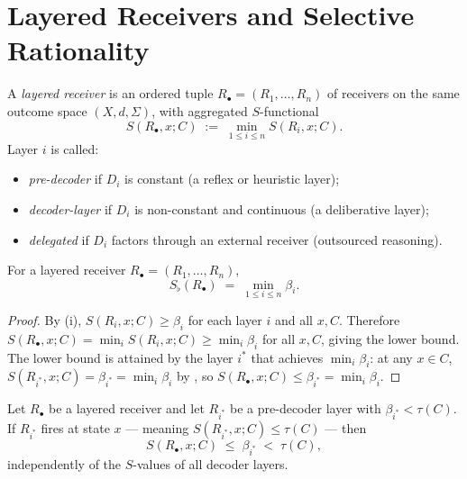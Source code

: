 \documentclass[twocolumn,11pt,a4paper]{article}
\newcommand{\Sfloor}{S_{\flat}}
\begin{document}
\section{Layered Receivers and Selective Rationality}
\label{sec:layered}

\begin{definition}
\label{def:layered}
A \emph{layered receiver} is an ordered tuple
$R_\bullet=(R_1,\ldots,R_n)$ of receivers on the same outcome space
$(X,d,\Sigma)$, with aggregated $S$-functional
\[
  S(R_\bullet,x;C)\;:=\;\min_{1\leq i\leq n}S(R_i,x;C).
\]
Layer $i$ is called:
\begin{itemize}[leftmargin=*]
  \item \emph{pre-decoder} if $D_i$ is constant (a reflex or heuristic
    layer);
  \item \emph{decoder-layer} if $D_i$ is non-constant and continuous (a
    deliberative layer);
  \item \emph{delegated} if $D_i$ factors through an external receiver
    (outsourced reasoning).
\end{itemize}
\end{definition}

\begin{proposition}
\label{prop:layeredfloor}
For a layered receiver $R_\bullet=(R_1,\ldots,R_n)$,
\[
  \Sfloor(R_\bullet)\;=\;\min_{1\leq i\leq n}\beta_i.
\]
\end{proposition}

\begin{proof}
By (i), $S(R_i,x;C)\geq\beta_i$ for each layer
$i$ and all $x,C$.  Therefore
$S(R_\bullet,x;C)=\min_i S(R_i,x;C)\geq\min_i\beta_i$ for all $x,C$,
giving the lower bound.  The lower bound is attained by the layer $i^*$
that achieves $\min_i\beta_i$: at any $x\in C$,
$S(R_{i^*},x;C)=\beta_{i^*}=\min_i\beta_i$ by , so
$S(R_\bullet,x;C)\leq\beta_{i^*}=\min_i\beta_i$.
\end{proof}

\begin{theorem}
\label{thm:modenonprivilege}
Let $R_\bullet$ be a layered receiver and let $R_{i^*}$ be a
pre-decoder layer with $\beta_{i^*}<\tau(C)$.  If $R_{i^*}$ fires at
state $x$ — meaning $S(R_{i^*},x;C)\leq\tau(C)$ — then
\[
  S(R_\bullet,x;C)\;\leq\;\beta_{i^*}\;<\;\tau(C),
\]
independently of the $S$-values of all decoder layers.
\end{theorem}
\end{document}

